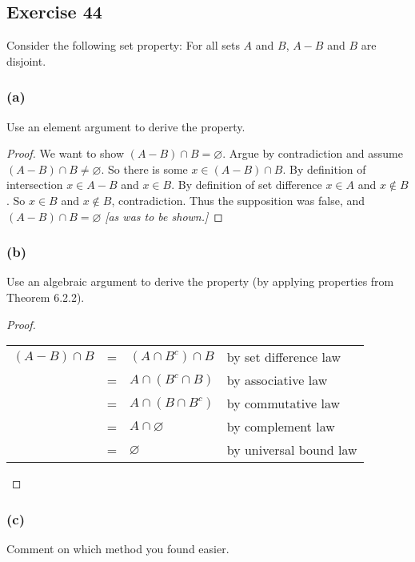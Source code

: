 \documentclass[14pt]{extarticle}
\newcommand{\es}{\varnothing}
\newcommand{\cy}{\color{cyan}}
\begin{document}
\subsection{Exercise 44}
Consider the following set property: For all sets $A$ and $B$, $A - B$ and $B$ are disjoint.

\subsubsection{(a)}
Use an element argument to derive the property.

\begin{proof}
  We want to show \((A - B) \cap B = \es\). Argue by contradiction and assume \((A - B) \cap B \neq \es\).
  So there is some \(x \in (A - B) \cap B\). By definition of intersection \(x \in A-B\) and \(x \in B\). By definition
  of set difference \(x \in A\) and \(x \notin B\). So \(x \in B\) and \(x \notin B\), contradiction. Thus the
  supposition was false, and \((A - B) \cap B = \es\) {\it [as was to be shown.]}
\end{proof}

\subsubsection{(b)}
Use an algebraic argument to derive the property (by applying properties from Theorem 6.2.2).

\begin{proof}
  \begin{center}
    \begin{tabular}{rcll}
      \((A - B) \cap B\) & = & \((A \cap B^c) \cap B\) & {\cy by set difference law}  \\
                         & = & \(A \cap (B^c \cap B)\) & {\cy by associative law}     \\
                         & = & \(A \cap (B \cap B^c)\) & {\cy by commutative law}     \\
                         & = & \(A \cap \es\)          & {\cy by complement law}      \\
                         & = & \(\es\)                 & {\cy by universal bound law}
    \end{tabular}
  \end{center}
\end{proof}

\subsubsection{(c)}
Comment on which method you found easier.
\end{document}
